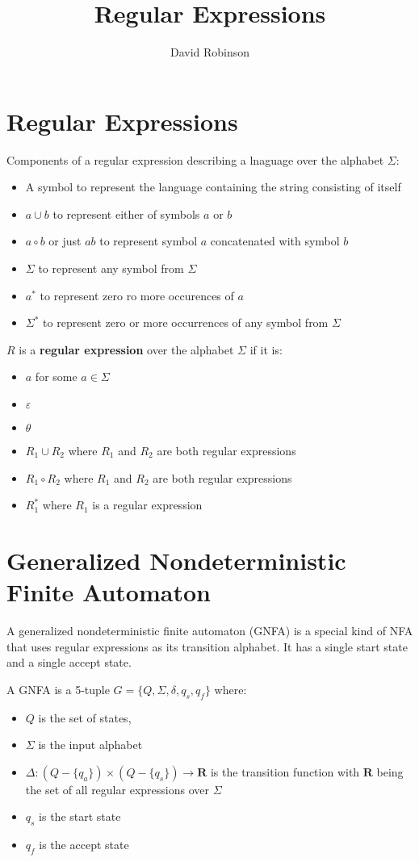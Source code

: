 \documentclass{article}
\title{Regular Expressions}
\author{David Robinson}
\date{}
\begin{document}
\maketitle

\section*{Regular Expressions}

Components of a regular expression describing a lnaguage over the alphabet $\Sigma$:
\begin{itemize}
    \item A symbol to represent the language containing the string consisting of itself
    \item $a\cup b$ to represent either of symbols $a$ or $b$
    \item $a\circ b$ or just $ab$ to represent symbol $a$ concatenated with symbol $b$
    \item $\Sigma$ to represent any symbol from $\Sigma$
    \item $a^*$ to represent zero ro more occurences of $a$
    \item $\Sigma^*$ to represent zero or more occurrences of any symbol from $\Sigma$
\end{itemize}

$R$ is a \textbf{regular expression} over the alphabet $\Sigma$ if it is:
\begin{itemize}
    \item $a$ for some $a\in\Sigma$
    \item $\varepsilon$
    \item $\theta$
    \item $R_1\cup R_2$ where $R_1$ and $R_2$ are both regular expressions
    \item $R_1\circ R_2$ where $R_1$ and $R_2$ are both regular expressions
    \item $R_1^*$ where $R_1$ is a regular expression
\end{itemize}

\section*{Generalized Nondeterministic Finite Automaton}

A generalized nondeterministic finite automaton (GNFA) is a special kind of NFA that uses regular expressions as its transition alphabet. It has a single start state and a single accept state.
\vspace{1em}

A GNFA is a 5-tuple $G=\{Q,\Sigma,\delta,q_s,q_f\}$ where:
\begin{itemize}
    \item $Q$ is the set of states,
    \item $\Sigma$ is the input alphabet
    \item $\Delta: (Q-\{q_a\})\times(Q-\{q_s\})\rightarrow\mathbf{R}$ is the transition function with $\mathbf{R}$ being the set of all regular expressions over $\Sigma$
    \item $q_s$ is the start state
    \item $q_f$ is the accept state
\end{itemize}
\end{document}
